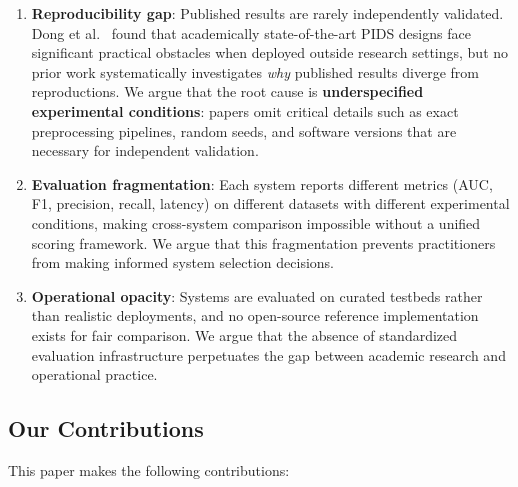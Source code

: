 \documentclass[11pt,a4paper]{article}
\begin{document}
\begin{enumerate}[leftmargin=*]
    \item \textbf{Reproducibility gap}: Published results are rarely independently validated. Dong et al.\ \cite{dong2023industrial} found that academically state-of-the-art PIDS designs face significant practical obstacles when deployed outside research settings, but no prior work systematically investigates \emph{why} published results diverge from reproductions. We argue that the root cause is \textbf{underspecified experimental conditions}: papers omit critical details such as exact preprocessing pipelines, random seeds, and software versions that are necessary for independent validation.

    \item \textbf{Evaluation fragmentation}: Each system reports different metrics (AUC, F1, precision, recall, latency) on different datasets with different experimental conditions, making cross-system comparison impossible without a unified scoring framework. We argue that this fragmentation prevents practitioners from making informed system selection decisions.

    \item \textbf{Operational opacity}: Systems are evaluated on curated testbeds rather than realistic deployments, and no open-source reference implementation exists for fair comparison. We argue that the absence of standardized evaluation infrastructure perpetuates the gap between academic research and operational practice.
\end{enumerate}

\subsection{Our Contributions}

This paper makes the following contributions:
\end{document}

